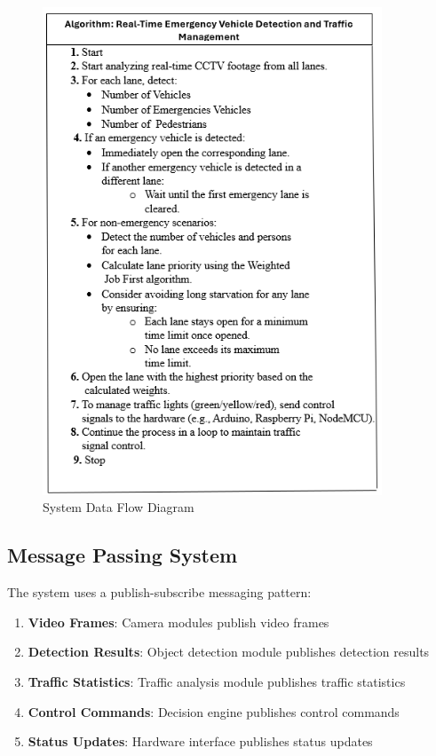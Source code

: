 \begin{figure}[h]
    \centering
    \includegraphics[width=0.9\textwidth]{figures/10.png}
    \caption{System Data Flow Diagram}
    \label{fig:data_flow}
\end{figure}

\subsection{Message Passing System}

The system uses a publish-subscribe messaging pattern:

\begin{enumerate}
    \item \textbf{Video Frames}: Camera modules publish video frames
    \item \textbf{Detection Results}: Object detection module publishes detection results
    \item \textbf{Traffic Statistics}: Traffic analysis module publishes traffic statistics
    \item \textbf{Control Commands}: Decision engine publishes control commands
    \item \textbf{Status Updates}: Hardware interface publishes status updates
\end{enumerate}

